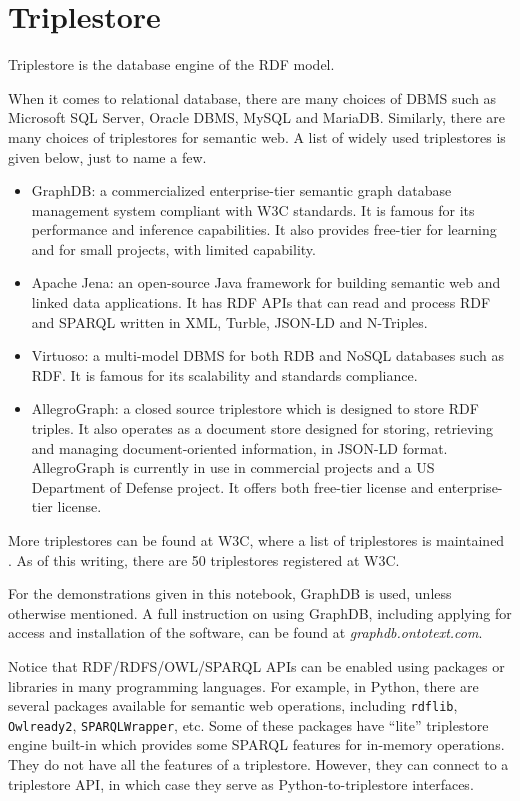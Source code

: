\section{Triplestore}

Triplestore is the database engine of the RDF model. 

When it comes to relational database, there are many choices of DBMS such as Microsoft SQL Server, Oracle DBMS, MySQL and MariaDB. Similarly, there are many choices of triplestores for semantic web. A list of widely used triplestores is given below, just to name a few.
\begin{itemize}
	\item GraphDB: a commercialized enterprise-tier semantic graph database management system compliant with W3C standards. It is famous for its performance and inference capabilities. It also provides free-tier for learning and for small projects, with limited capability.
	\item Apache Jena: an open-source Java framework for building semantic web and linked data applications. It has RDF APIs that can read and process RDF and SPARQL written in XML, Turble, JSON-LD and N-Triples.
	\item Virtuoso: a multi-model DBMS for both RDB and NoSQL databases such as RDF. It is famous for its scalability and standards compliance.
	\item AllegroGraph: a closed source triplestore which is designed to store RDF triples. It also operates as a document store designed for storing, retrieving and managing document-oriented information, in JSON-LD format. AllegroGraph is currently in use in commercial projects and a US Department of Defense project. It offers both free-tier license and enterprise-tier license.
\end{itemize}

More triplestores can be found at W3C, where a list of triplestores is maintained \cite{triplestore,largetriplestore}. As of this writing, there are 50 triplestores registered at W3C.

For the demonstrations given in this notebook, GraphDB is used, unless otherwise mentioned. A full instruction on using GraphDB, including applying for access and installation of the software, can be found at \textit{graphdb.ontotext.com}.

Notice that RDF/RDFS/OWL/SPARQL APIs can be enabled using packages or libraries in many programming languages. For example, in Python, there are several packages available for semantic web operations, including \verb|rdflib|, \verb|Owlready2|, \verb|SPARQLWrapper|, etc. Some of these packages have ``lite'' triplestore engine built-in which provides some SPARQL features for in-memory operations. They do not have all the features of a triplestore. However, they can connect to a triplestore API, in which case they serve as Python-to-triplestore interfaces.



